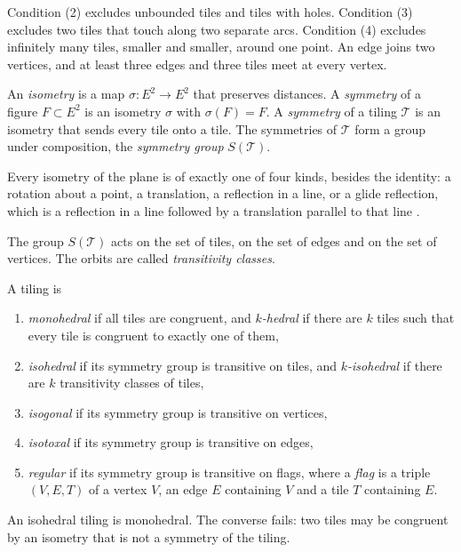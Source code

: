 \noindent
Condition (2) excludes unbounded tiles and
tiles with holes. Condition (3) excludes two
tiles that touch along two separate arcs.
Condition (4) excludes infinitely many tiles,
smaller and smaller, around one point. An edge
joins two vertices, and at least three edges
and three tiles meet at every vertex.

\begin{definition}
\label{definition-symmetry}
An \emph{isometry} is a map
$\sigma:E^2\to E^2$ that preserves distances.
A \emph{symmetry} of a figure $F\subset E^2$
is an isometry $\sigma$ with $\sigma(F)=F$.
A \emph{symmetry} of a tiling $\mathcal{T}$ is
an isometry that sends every tile onto a
tile. The symmetries of $\mathcal{T}$ form a
group under composition, the
\emph{symmetry group} $S(\mathcal{T})$.
\end{definition}

\noindent
Every isometry of the plane is of exactly one
of four kinds, besides the identity: a
rotation about a point, a translation, a
reflection in a line, or a glide reflection,
which is a reflection in a line followed by a
translation parallel to that line
\cite{GrunbaumShephard1987}.

The group $S(\mathcal{T})$ acts on the set of
tiles, on the set of edges and on the set of
vertices. The orbits are called
\emph{transitivity classes}.

\begin{definition}
\label{definition-isohedral}
A tiling is
\begin{enumerate}
\item \emph{monohedral} if all tiles are
congruent, and \emph{$k$-hedral} if there are
$k$ tiles such that every tile is congruent to
exactly one of them,
\item \emph{isohedral} if its symmetry group
is transitive on tiles, and
\emph{$k$-isohedral} if there are $k$
transitivity classes of tiles,
\item \emph{isogonal} if its symmetry group is
transitive on vertices,
\item \emph{isotoxal} if its symmetry group is
transitive on edges,
\item \emph{regular} if its symmetry group is
transitive on flags, where a \emph{flag} is a
triple $(V,E,T)$ of a vertex $V$, an edge $E$
containing $V$ and a tile $T$ containing $E$.
\end{enumerate}
\end{definition}

\noindent
An isohedral tiling is monohedral. The
converse fails: two tiles may be congruent by
an isometry that is not a symmetry of the
tiling.

